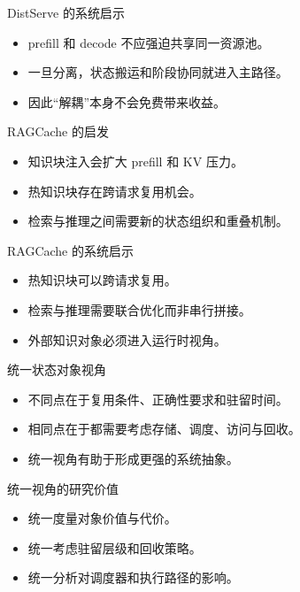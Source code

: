 \begin{frame}{DistServe 的系统启示}
  \begin{itemize}
    \item prefill 和 decode 不应强迫共享同一资源池。
    \item 一旦分离，状态搬运和阶段协同就进入主路径。
    \item 因此“解耦”本身不会免费带来收益。
  \end{itemize}
\end{frame}

\begin{frame}{RAGCache 的启发}
  \begin{itemize}
    \item 知识块注入会扩大 prefill 和 KV 压力。
    \item 热知识块存在跨请求复用机会。
    \item 检索与推理之间需要新的状态组织和重叠机制。
  \end{itemize}
\end{frame}

\begin{frame}{RAGCache 的系统启示}
  \begin{itemize}
    \item 热知识块可以跨请求复用。
    \item 检索与推理需要联合优化而非串行拼接。
    \item 外部知识对象必须进入运行时视角。
  \end{itemize}
\end{frame}

\begin{frame}{统一状态对象视角}
  \begin{itemize}
    \item 不同点在于复用条件、正确性要求和驻留时间。
    \item 相同点在于都需要考虑存储、调度、访问与回收。
    \item 统一视角有助于形成更强的系统抽象。
  \end{itemize}
\end{frame}

\begin{frame}{统一视角的研究价值}
  \begin{itemize}
    \item 统一度量对象价值与代价。
    \item 统一考虑驻留层级和回收策略。
    \item 统一分析对调度器和执行路径的影响。
  \end{itemize}
\end{frame}


